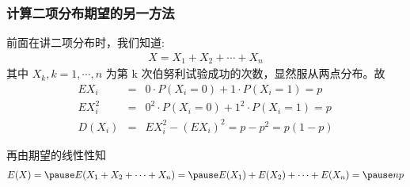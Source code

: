 	\begin{frame}
		\frametitle{计算二项分布期望的另一方法}
		前面在讲二项分布时，我们知道:
		\begin{eqnarray*}
			X=X_1+X_2+\cdots+X_n
		\end{eqnarray*}
		其中 $X_k, k=1,\cdots, n$ 为第 k 次伯努利试验成功的次数，显然服从两点分布。故 \pause
		\begin{eqnarray*}
			EX_i&=&0\cdot P(X_i=0)+1\cdot P(X_i=1)=p\\
			EX_i^2&=&0^2\cdot P(X_i=0)+1^2\cdot P(X_i=1)=p\\
			D(X_i)&=&EX_i^2-(EX_i)^2=p-p^2=p(1-p)
		\end{eqnarray*}


		\pause 再由期望的线性性知
		\begin{eqnarray*}
			E(X)=\pause E(X_1+X_2+\cdots+X_n)=\pause E(X_1)+E(X_2)+\cdots +E(X_n)=\pause np
		\end{eqnarray*}
	\end{frame}

